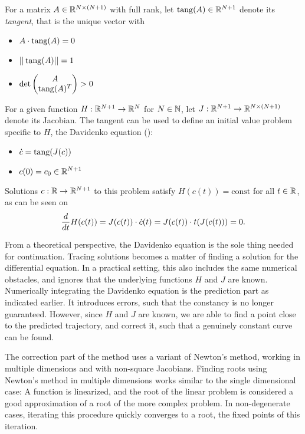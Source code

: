 For a matrix $A \in \mathbb{R}^{N \times (N+1)}$ with full rank, let $\operatorname{tang}(A) \in \mathbb{R}^{N+1}$ denote its \emph{tangent}, that is the unique vector with
	\begin{itemize}
		\item $\displaystyle A \cdot \operatorname{tang}(A) = 0$
		\item $\displaystyle ||\operatorname{tang}(A)|| = 1$
		\item $\displaystyle \det \begin{pmatrix}
			A\\
			\operatorname{tang}(A)^T
		\end{pmatrix} > 0$
	\end{itemize}
For a given function $H: \mathbb{R}^{N+1} \to \mathbb{R}^N$ for $N \in \mathbb{N}$, let $J: \mathbb{R}^{N+1} \to \mathbb{R}^{N \times (N+1)}$ denote its Jacobian.
The tangent can be used to define an initial value problem specific to $H$, the Davidenko equation (\cite{davidenko1953new}): %
	\begin{itemize}
		\item $\displaystyle \dot c = \operatorname{tang}(J(c))$ %
		\item $\displaystyle c(0) = c_0 \in \mathbb{R}^{N+1}$
	\end{itemize}
Solutions $c: \mathbb{R} \to \mathbb{R}^{N+1}$ to this problem satisfy $H(c(t)) = \text{const}$ for all $t \in \mathbb{R}$, as can be seen on
	\[
		\frac{d}{dt} H(c(t)) = J(c(t)) \cdot \dot c(t) = J(c(t)) \cdot t(J(c(t))) = 0 \text.
	\]

From a theoretical perspective, the Davidenko equation is the sole thing needed for continuation.
Tracing solutions becomes a matter of finding a solution for the differential equation.
In a practical setting, this also includes the same numerical obstacles, and ignores that the underlying functions $H$ and $J$ are known.
Numerically integrating the Davidenko equation is the prediction part as indicated earlier.
It introduces errors, such that the constancy is no longer guaranteed.
However, since $H$ and $J$ are known, we are able to find a point close to the predicted trajectory, and correct it, such that a genuinely constant curve can be found.

The correction part of the method uses a variant of Newton's method, working in multiple dimensions and with non-square Jacobians.
Finding roots using Newton's method in multiple dimensions works similar to the single dimensional case: A function is linearized, and the root of the linear problem is considered a good approximation of a root of the more complex problem.
In non-degenerate cases, iterating this procedure quickly converges to a root, the fixed points of this iteration.

